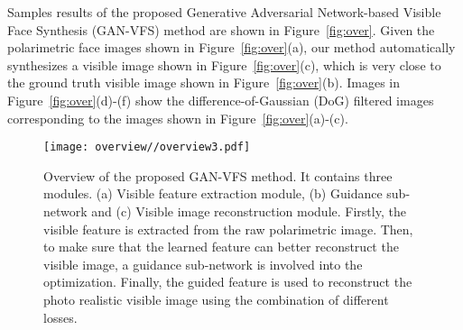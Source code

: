 \documentclass[10pt,twocolumn,letterpaper]{article}
\begin{document}
Samples results of the proposed Generative Adversarial Network-based Visible Face Synthesis (GAN-VFS) method are shown in Figure~\ref{fig:over}.  Given the polarimetric face images shown in Figure~\ref{fig:over}(a), our method automatically synthesizes a visible image shown in Figure~\ref{fig:over}(c), which is very close to the ground truth visible image shown in Figure~\ref{fig:over}(b).  Images in Figure~\ref{fig:over}(d)-(f) show the difference-of-Gaussian (DoG) filtered images corresponding to the images shown in Figure~\ref{fig:over}(a)-(c).



\begin{figure*}[t]
\centering
\texttt{[image: overview//overview3.pdf]}
\vskip-20pt \caption{Overview of the proposed GAN-VFS method.  It contains three modules. (a) Visible feature extraction module, (b) Guidance sub-network and (c) Visible image reconstruction module. Firstly, the visible feature is extracted from the raw polarimetric image.  Then, to make sure that the learned feature can better reconstruct the visible image, a guidance sub-network is involved into the optimization. Finally, the guided feature is used to reconstruct the photo realistic visible image using the combination of different losses.}
\label{fig:overview}
\end{figure*}
\end{document}
